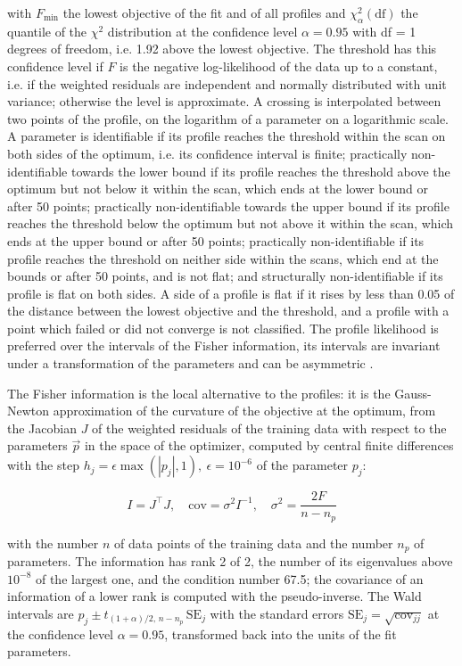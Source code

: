 with $F_{\min}$ the lowest objective of the fit and of all profiles and $\chi^2_{\alpha}(\mathrm{df})$ the quantile of the $\chi^2$ distribution at the confidence level $\alpha = 0.95$ with df = 1 degrees of freedom, i.e. 1.92 above the lowest objective. The threshold has this confidence level if $F$ is the negative log-likelihood of the data up to a constant, i.e. if the weighted residuals are independent and normally distributed with unit variance; otherwise the level is approximate. A crossing is interpolated between two points of the profile, on the logarithm of a parameter on a logarithmic scale. A parameter is identifiable if its profile reaches the threshold within the scan on both sides of the optimum, i.e. its confidence interval is finite; practically non-identifiable towards the lower bound if its profile reaches the threshold above the optimum but not below it within the scan, which ends at the lower bound or after 50 points; practically non-identifiable towards the upper bound if its profile reaches the threshold below the optimum but not above it within the scan, which ends at the upper bound or after 50 points; practically non-identifiable if its profile reaches the threshold on neither side within the scans, which end at the bounds or after 50 points, and is not flat; and structurally non-identifiable if its profile is flat on both sides. A side of a profile is flat if it rises by less than 0.05 of the distance between the lowest objective and the threshold, and a profile with a point which failed or did not converge is not classified. The profile likelihood is preferred over the intervals of the Fisher information, its intervals are invariant under a transformation of the parameters and can be asymmetric \cite{Wieland2021}.

The Fisher information is the local alternative to the profiles: it is the Gauss-Newton approximation of the curvature of the objective at the optimum, from the Jacobian $J$ of the weighted residuals of the training data with respect to the parameters $\vec{p}$ in the space of the optimizer, computed by central finite differences with the step $h_j = \epsilon \max(|p_j|, 1),\ \epsilon = 10^{-6}$ of the parameter $p_j$:

\begin{equation}
I = J^\top J, \quad \mathrm{cov} = \sigma^2 I^{-1}, \quad \sigma^2 = \frac{2 F}{n - n_p}
\end{equation}

with the number $n$ of data points of the training data and the number $n_p$ of parameters. The information has rank 2 of 2, the number of its eigenvalues above $10^{-8}$ of the largest one, and the condition number 67.5; the covariance of an information of a lower rank is computed with the pseudo-inverse. The Wald intervals are $\hat{p}_j \pm t_{(1+\alpha)/2,\, n-n_p}\, \mathrm{SE}_j$ with the standard errors $\mathrm{SE}_j = \sqrt{\mathrm{cov}_{jj}}$ at the confidence level $\alpha = 0.95$, transformed back into the units of the fit parameters.


